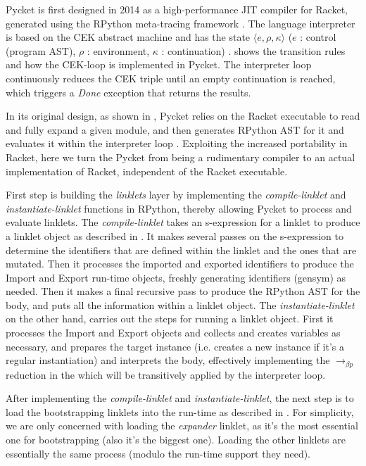 Pycket is first designed in 2014 as a high-performance JIT compiler
for Racket, generated using the RPython meta-tracing framework
\cite{bolz14-racket}. The language interpreter is based on the CEK
abstract machine and has the state $\langle e, \rho, \kappa \rangle$ ($e$ : control
(program AST), $\rho$ : environment, $\kappa$ : continuation)
\cite{felleisen87}.  shows the transition rules and
how the CEK-loop is implemented in Pycket. The interpreter loop
continuously reduces the CEK triple until an empty continuation is
reached, which triggers a \emph{Done} exception that returns the
results.

In its original design, as shown in , Pycket
relies on the Racket executable to read and fully expand a given
module\cite{samth:11}, and then generates RPython AST for it and
evaluates it within the interpreter loop \cite{pycket15}. Exploiting
the increased portability in Racket, here we turn the Pycket from
being a rudimentary compiler to an actual implementation of Racket,
independent of the Racket executable.

First step is building the \emph{linklets} layer by implementing the
\emph{compile-linklet} and \emph{instantiate-linklet} functions in
RPython, thereby allowing Pycket to process and evaluate linklets. The
\emph{compile-linklet} takes an s-expression for a linklet to produce
a linklet object as described in
. It makes several passes on the
s-expression to determine the identifiers that are defined within the
linklet and the ones that are mutated. Then it processes the imported
and exported identifiers to produce the Import and Export run-time
objects, freshly generating identifiers (gensym) as needed. Then it
makes a final recursive pass to produce the RPython AST for the body,
and puts all the information within a linklet object. The
\emph{instantiate-linklet} on the other hand, carries out the steps
for running a linklet object. First it processes the Import and Export
objects and collects and creates variables as necessary, and prepares
the target instance (i.e. creates a new instance if it's a regular
instantiation) and interprets the body, effectively implementing the
$\longrightarrow_{\beta p}$ reduction in the  which will be
transitively applied by the interpreter loop.

After implementing the \emph{compile-linklet} and
\emph{instantiate-linklet}, the next step is to load the bootstrapping
linklets into the run-time as described in
. For simplicity, we are only concerned
with loading the \emph{expander} linklet, as it's the most essential
one for bootstrapping (also it's the biggest one). Loading the other
linklets are essentially the same process (modulo the run-time support
they need).

